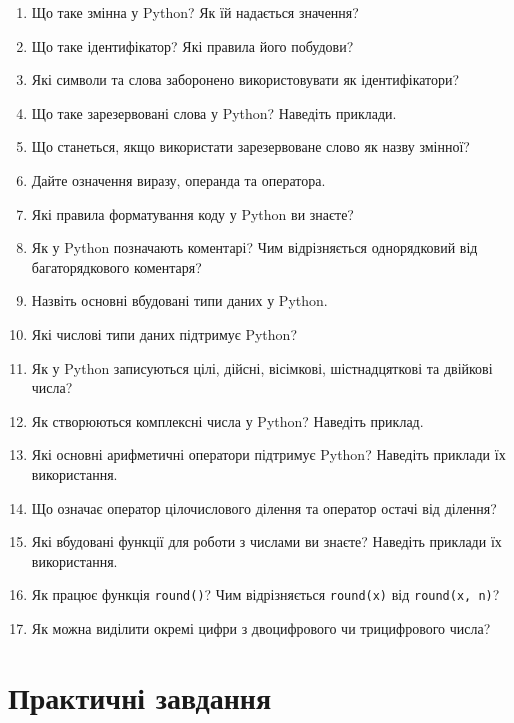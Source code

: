 	\begin{enumerate}
		\item Що таке змінна у Python? Як їй надається значення?
		\item Що таке ідентифікатор? Які правила його побудови?
		\item Які символи та слова заборонено використовувати як ідентифікатори?
		\item Що таке зарезервовані слова у Python? Наведіть приклади.
		\item Що станеться, якщо використати зарезервоване слово як назву змінної?
		\item Дайте означення виразу, операнда та оператора.
		\item Які правила форматування коду у Python ви знаєте?
		\item Як у Python позначають коментарі? Чим відрізняється однорядковий від багаторядкового коментаря?
		\item Назвіть основні вбудовані типи даних у Python.
		\item Які числові типи даних підтримує Python?
		\item Як у Python записуються цілі, дійсні, вісімкові, шістнадцяткові та двійкові числа?
		\item Як створюються комплексні числа у Python? Наведіть приклад.
		\item Які основні арифметичні оператори підтримує Python? Наведіть приклади їх використання.
		\item Що означає оператор цілочислового ділення та оператор остачі від ділення?
		\item Які вбудовані функції для роботи з числами ви знаєте? Наведіть приклади їх використання.
		\item Як працює функція \texttt{round()}? Чим відрізняється \texttt{round(x)} від \texttt{round(x, n)}?
		\item Як можна виділити окремі цифри з двоцифрового чи трицифрового числа?
	\end{enumerate}
	
	\section*{Практичні завдання}
	
